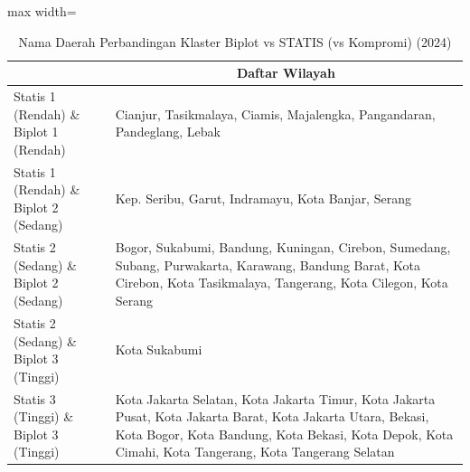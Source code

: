 \begin{table}[H]
\centering
\caption{Nama Daerah Perbandingan Klaster Biplot vs STATIS (vs Kompromi) (2024)} \label{tab:app2biplot_statis_name_2024}
\begin{adjustbox}{max width=\textwidth}
\begin{tabular}{|>{\centering\arraybackslash}p{4cm}|p{10cm}|}
\hline
\multicolumn{1}{|c|}{\textbf{Kategori}} & \multicolumn{1}{c|}{\textbf{Daftar Wilayah}} \\
\hline
Statis 1 (Rendah) \& Biplot 1 (Rendah) & Cianjur, Tasikmalaya, Ciamis, Majalengka, Pangandaran, Pandeglang, Lebak \\
\hline
Statis 1 (Rendah) \& Biplot 2 (Sedang) & Kep. Seribu, Garut, Indramayu, Kota Banjar, Serang \\
\hline
Statis 2 (Sedang) \& Biplot 2 (Sedang) & Bogor, Sukabumi, Bandung, Kuningan, Cirebon, Sumedang, Subang, Purwakarta, Karawang, Bandung Barat, Kota Cirebon, Kota Tasikmalaya, Tangerang, Kota Cilegon, Kota Serang \\
\hline
Statis 2 (Sedang) \& Biplot 3 (Tinggi) & Kota Sukabumi \\
\hline
Statis 3 (Tinggi) \& Biplot 3 (Tinggi) & Kota Jakarta Selatan, Kota Jakarta Timur, Kota Jakarta Pusat, Kota Jakarta Barat, Kota Jakarta Utara, Bekasi, Kota Bogor, Kota Bandung, Kota Bekasi, Kota Depok, Kota Cimahi, Kota Tangerang, Kota Tangerang Selatan \\
\hline
\end{tabular}
\end{adjustbox}
\end{table}